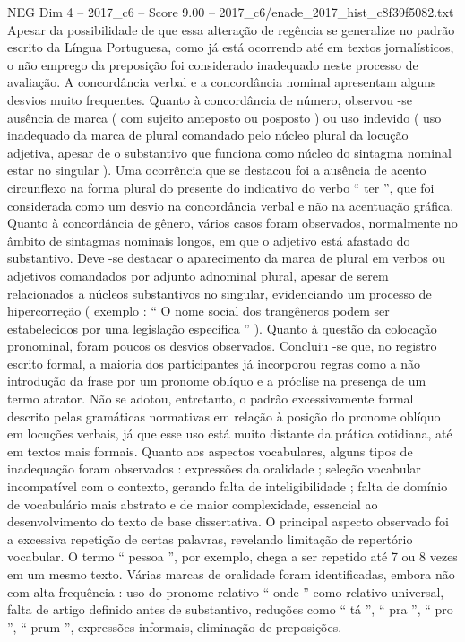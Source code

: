 \begin{textsample}{NEG Dim 4 – 2017\_c6 – Score 9.00 – 2017\_c6/enade\_2017\_hist\_c8f39f5082.txt}
Apesar da possibilidade de que essa alteração de regência se generalize no padrão escrito da Língua Portuguesa, como já está ocorrendo até em textos jornalísticos, o não emprego da preposição foi considerado inadequado neste processo de avaliação.
A concordância verbal e a concordância nominal apresentam alguns desvios muito frequentes.
Quanto à concordância de número, observou -se ausência de marca ( com sujeito anteposto ou posposto ) ou uso indevido ( uso inadequado da marca de plural comandado pelo núcleo plural da locução adjetiva, apesar de o substantivo que funciona como núcleo do sintagma nominal estar no singular ).
Uma ocorrência que se destacou foi a ausência de acento circunflexo na forma plural do presente do indicativo do verbo “ ter ”, que foi considerada como um desvio na concordância verbal e não na acentuação gráfica.
Quanto à concordância de gênero, vários casos foram observados, normalmente no âmbito de sintagmas nominais longos, em que o adjetivo está afastado do substantivo.
Deve -se destacar o aparecimento da marca de plural em verbos ou adjetivos comandados por adjunto adnominal plural, apesar de serem relacionados a núcleos substantivos no singular, evidenciando um processo de hipercorreção ( exemplo : “ O nome social dos trangêneros podem ser estabelecidos por uma legislação específica ” ).
Quanto à questão da colocação pronominal, foram poucos os desvios observados.
Concluiu -se que, no registro escrito formal, a maioria dos participantes já incorporou regras como a não introdução da frase por um pronome oblíquo e a próclise na presença de um termo atrator.
Não se adotou, entretanto, o padrão excessivamente formal descrito pelas gramáticas normativas em relação à posição do pronome oblíquo em locuções verbais, já que esse uso está muito distante da prática cotidiana, até em textos mais formais.
Quanto aos aspectos vocabulares, alguns tipos de inadequação foram observados : expressões da oralidade ; seleção vocabular incompatível com o contexto, gerando falta de inteligibilidade ; falta de domínio de vocabulário mais abstrato e de maior complexidade, essencial ao desenvolvimento do texto de base dissertativa.
O principal aspecto observado foi a excessiva repetição de certas palavras, revelando limitação de repertório vocabular.
O termo “ pessoa ”, por exemplo, chega a ser repetido até 7 ou 8 vezes em um mesmo texto.
Várias marcas de oralidade foram identificadas, embora não com alta frequência : uso do pronome relativo “ onde ” como relativo universal, falta de artigo definido antes de substantivo, reduções como “ tá ”, “ pra ”, “ pro ”, “ prum ”, expressões informais, eliminação de preposições.

\end{textsample}
